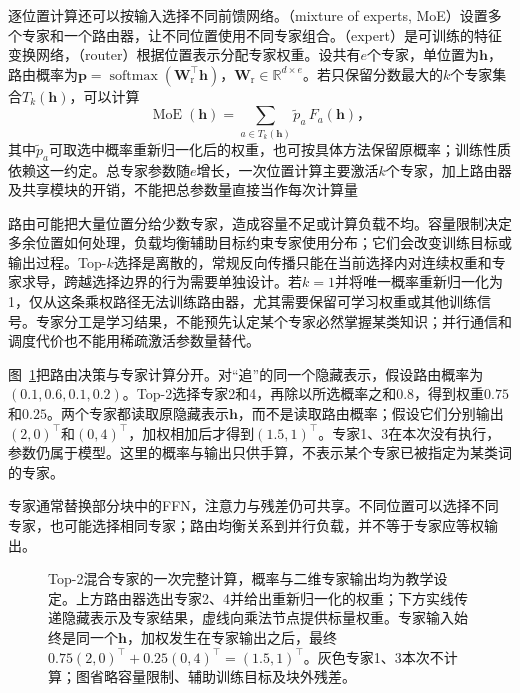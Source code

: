 逐位置计算还可以按输入选择不同前馈网络。（mixture of experts, MoE）设置多个专家和一个路由器，让不同位置使用不同专家组合。（expert）是可训练的特征变换网络，（router）根据位置表示分配专家权重。设共有$e$个专家，单位置为$\bm h$，路由概率为$\bm p=\operatorname{softmax}(\bm W_{\mathrm r}^{\top}\bm h)$，$\bm W_{\mathrm r}\in\mathbb R^{d\times e}$。若只保留分数最大的$k$个专家集合$T_k(\bm h)$，可以计算
\begin{equation}
  \operatorname{MoE}(\bm h)
    =\sum_{a\in T_k(\bm h)}\widetilde p_a\,F_a(\bm h)\text{，}
  \label{eq:transformer-moe}
\end{equation}
其中$\widetilde p_a$可取选中概率重新归一化后的权重，也可按具体方法保留原概率；训练性质依赖这一约定。总专家参数随$e$增长，一次位置计算主要激活$k$个专家，加上路由器及共享模块的开销，不能把总参数量直接当作每次计算量

路由可能把大量位置分给少数专家，造成容量不足或计算负载不均。容量限制决定多余位置如何处理，负载均衡辅助目标约束专家使用分布；它们会改变训练目标或输出过程。Top-$k$选择是离散的，常规反向传播只能在当前选择内对连续权重和专家求导，跨越选择边界的行为需要单独设计。若$k=1$并将唯一概率重新归一化为1，仅从这条乘权路径无法训练路由器，尤其需要保留可学习权重或其他训练信号。专家分工是学习结果，不能预先认定某个专家必然掌握某类知识；并行通信和调度代价也不能用稀疏激活参数量替代。

图~\ref{fig:transformer-moe}把路由决策与专家计算分开。对“追”的同一个隐藏表示，假设路由概率为$(0.1,0.6,0.1,0.2)$。Top-2选择专家2和4，再除以所选概率之和$0.8$，得到权重$0.75$和$0.25$。两个专家都读取原隐藏表示$\bm h$，而不是读取路由概率；假设它们分别输出$(2,0)^{\top}$和$(0,4)^{\top}$，加权相加后才得到$(1.5,1)^{\top}$。专家1、3在本次没有执行，参数仍属于模型。这里的概率与输出只供手算，不表示某个专家已被指定为某类词的专家。

专家通常替换部分块中的FFN，注意力与残差仍可共享。不同位置可以选择不同专家，也可能选择相同专家；路由均衡关系到并行负载，并不等于专家应等权输出。

\begin{figure}[htbp]
  \centering
  
  \caption{Top-2混合专家的一次完整计算，概率与二维专家输出均为教学设定。上方路由器选出专家2、4并给出重新归一化的权重；下方实线传递隐藏表示及专家结果，虚线向乘法节点提供标量权重。专家输入始终是同一个$\bm h$，加权发生在专家输出之后，最终$0.75(2,0)^{\top}+0.25(0,4)^{\top}=(1.5,1)^{\top}$。灰色专家1、3本次不计算；图省略容量限制、辅助训练目标及块外残差。}
  \label{fig:transformer-moe}
\end{figure}
\FloatBarrier

